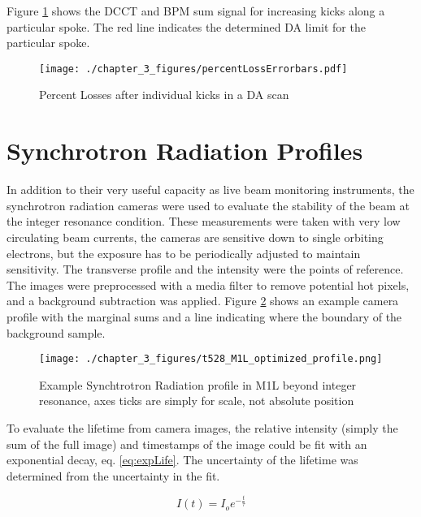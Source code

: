 Figure \ref{fig:daLimit} shows the DCCT and BPM sum signal for increasing kicks along a particular spoke. The red line indicates the determined DA limit for the particular spoke.

\begin{figure}
	\centering
	\texttt{[image: ./chapter\_3\_figures/percentLossErrorbars.pdf]}
	\caption{Percent Losses after individual kicks in a DA scan}
	\label{fig:daLimit}
\end{figure}

\section{Synchrotron Radiation Profiles} \label{sec:synchProfiles}
In addition to their very useful capacity as live beam monitoring instruments, the synchrotron radiation cameras were used to evaluate the stability of the beam at the integer resonance condition. These measurements were taken with very low circulating beam currents, the cameras are sensitive down to single orbiting electrons, but the exposure has to be periodically adjusted to maintain sensitivity. The transverse profile and the intensity were the points of reference. The images were preprocessed with a media filter to remove potential hot pixels, and a background subtraction was applied. Figure \ref{fig:synchBackground} shows an example camera profile with the marginal sums and a line indicating where the boundary of the background sample.

\begin{figure}
	\centering
	\texttt{[image: ./chapter\_3\_figures/t528\_M1L\_optimized\_profile.png]}
	\caption{Example Synchtrotron Radiation profile in M1L beyond integer resonance, axes ticks are simply for scale, not absolute position}
	\label{fig:synchBackground}
\end{figure}

To evaluate the lifetime from camera images, the relative intensity (simply the sum of the full image) and timestamps of the image could be fit with an exponential decay, eq. \ref{eq:expLife}. The uncertainty of the lifetime was determined from the uncertainty in the fit.

\begin{equation}
	I(t) = I_o e^{-\frac{t}{\tau}}
	\label{eq:expLife}
\end{equation}
